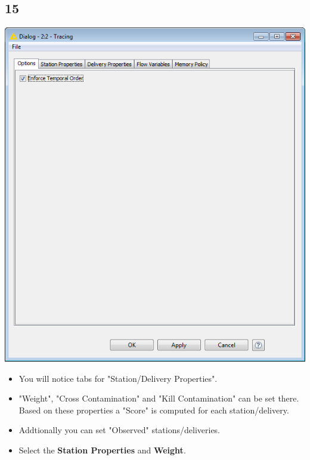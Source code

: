 \documentclass{beamer}
\begin{document}
\subsection{15}
\begin{frame}
	\begin{center}
  		\includegraphics[height=0.5\textheight]{15.png}
	\end{center}
	\begin{itemize}
		\item You will notice tabs for "Station/Delivery Properties".
		\item "Weight", "Cross Contamination" and "Kill Contamination" can be set there. Based on these properties a "Score" is computed for each station/delivery.
		\item Addtionally you can set "Observed" stations/deliveries.
		\item Select the \textbf{Station Properties} and \textbf{Weight}.
	\end{itemize}
\end{frame}
\end{document}
